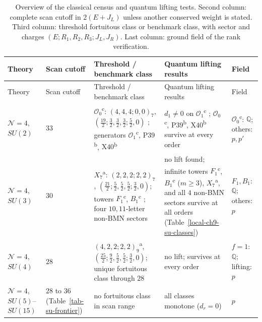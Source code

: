 \documentclass[11pt]{article}
\numberwithin{equation}{section}
\numberwithin{figure}{section}
\numberwithin{table}{section}
\begin{document}
{\footnotesize\renewcommand{\arraystretch}{1.28}\setlength{\tabcolsep}{3.5pt}
\begin{xltabular}{\linewidth}{|>{\raggedright\arraybackslash}p{2.35cm}|>{\raggedright\arraybackslash}p{2.15cm}|>{\raggedright\arraybackslash}X|>{\raggedright\arraybackslash}X|>{\raggedright\arraybackslash}p{1.75cm}|}
\caption{Overview of the classical census and quantum lifting tests. Second column: complete scan cutoff in $2(E+J_L)$ unless another conserved weight is stated. Third column: threshold fortuitous class or benchmark class, with sector and charges $(E;R_1,R_2,R_3;J_L,J_R)$. Last column: ground field of the rank verification.}\label{tab-census-overview}\\
\hline
Theory & Scan cutoff & Threshold / benchmark class & Quantum lifting results & Field\\
\hline\endfirsthead
\hline
Theory & Scan cutoff & Threshold / benchmark class & Quantum lifting results & Field\\
\hline\endhead
$\mathcal N=4$, $SU(2)$ & $33$ & $\mathcal O_0$\textsuperscript{c}: $(4,4,4;0,0)_7$, $(\tfrac{19}2;\tfrac32,\tfrac32,\tfrac32;\tfrac52,0)$ \cite{KKLP,ChangLinWords}; generators $\mathcal O_1$\textsuperscript{c}, $\mathrm{P39}$\textsuperscript{b}, $\mathrm{X40}$\textsuperscript{b} & $d_1\ne0$ on $\mathcal O_1$\textsuperscript{c} \cite{KKLP}; $\mathcal O_0$\textsuperscript{c}, $\mathrm{P39}$\textsuperscript{b}, $\mathrm{X40}$\textsuperscript{b} survive at every order & $\mathcal O_0$\textsuperscript{c}: $\mathbb Q$; others: $p,p'$\\
\hline
$\mathcal N=4$, $SU(3)$ & $30$ & $X_7$\textsuperscript{a}: $(2,2,2;2,2)_7$, $(\tfrac{21}2;\tfrac52,\tfrac52,\tfrac52;\tfrac32,0)$; towers $F_1$\textsuperscript{c}, $B_1$\textsuperscript{c} \cite{KLLS,BraneFused}; four $10,11$-letter non-BMN sectors & no lift found; infinite towers $F_1$\textsuperscript{c}, $B_1$\textsuperscript{c} ($m\ge3$), $X_7$\textsuperscript{a}, and all $4$ non-BMN sectors survive at all orders (Table~\ref{local-ch9-su-classes}) & $F_1,B_1$: $\mathbb Q$; others: $p$\\
\hline
$\mathcal N=4$, $SU(4)$ & $28$ & $(4,2,2;2,2)_9$\textsuperscript{a}, $(\tfrac{25}2;\tfrac92,\tfrac52,\tfrac52;\tfrac32,0)$; unique fortuitous class through $28$ & no lift; survives at every order & $f=1$: $\mathbb Q$; lifting: $p$\\
\hline
$\mathcal N=4$, $SU(5)$--$SU(15)$ & $28$ to $36$ (Table~\ref{tab-su-frontier}) & no fortuitous class in scan range & all classes monotone ($d_r=0$) & $p$\\

\end{xltabular}}
\end{document}
